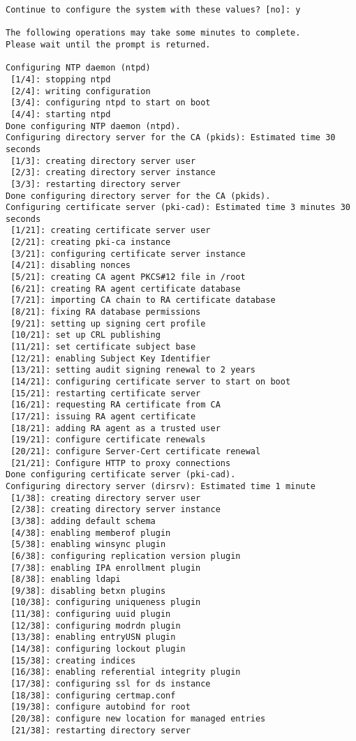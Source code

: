 \documentclass[a4paper,10pt,twoside]{article}
\begin{document}
\begin{verbatim}
Continue to configure the system with these values? [no]: y

The following operations may take some minutes to complete.
Please wait until the prompt is returned.

Configuring NTP daemon (ntpd)
 [1/4]: stopping ntpd
 [2/4]: writing configuration
 [3/4]: configuring ntpd to start on boot
 [4/4]: starting ntpd
Done configuring NTP daemon (ntpd).
Configuring directory server for the CA (pkids): Estimated time 30 seconds
 [1/3]: creating directory server user
 [2/3]: creating directory server instance
 [3/3]: restarting directory server
Done configuring directory server for the CA (pkids).
Configuring certificate server (pki-cad): Estimated time 3 minutes 30 seconds
 [1/21]: creating certificate server user
 [2/21]: creating pki-ca instance
 [3/21]: configuring certificate server instance
 [4/21]: disabling nonces
 [5/21]: creating CA agent PKCS#12 file in /root
 [6/21]: creating RA agent certificate database
 [7/21]: importing CA chain to RA certificate database
 [8/21]: fixing RA database permissions
 [9/21]: setting up signing cert profile
 [10/21]: set up CRL publishing
 [11/21]: set certificate subject base
 [12/21]: enabling Subject Key Identifier
 [13/21]: setting audit signing renewal to 2 years
 [14/21]: configuring certificate server to start on boot
 [15/21]: restarting certificate server
 [16/21]: requesting RA certificate from CA
 [17/21]: issuing RA agent certificate
 [18/21]: adding RA agent as a trusted user
 [19/21]: configure certificate renewals
 [20/21]: configure Server-Cert certificate renewal
 [21/21]: Configure HTTP to proxy connections
Done configuring certificate server (pki-cad).
Configuring directory server (dirsrv): Estimated time 1 minute
 [1/38]: creating directory server user
 [2/38]: creating directory server instance
 [3/38]: adding default schema
 [4/38]: enabling memberof plugin
 [5/38]: enabling winsync plugin
 [6/38]: configuring replication version plugin
 [7/38]: enabling IPA enrollment plugin
 [8/38]: enabling ldapi
 [9/38]: disabling betxn plugins
 [10/38]: configuring uniqueness plugin
 [11/38]: configuring uuid plugin
 [12/38]: configuring modrdn plugin
 [13/38]: enabling entryUSN plugin
 [14/38]: configuring lockout plugin
 [15/38]: creating indices
 [16/38]: enabling referential integrity plugin
 [17/38]: configuring ssl for ds instance
 [18/38]: configuring certmap.conf
 [19/38]: configure autobind for root
 [20/38]: configure new location for managed entries
 [21/38]: restarting directory server

\end{verbatim}
\end{document}
